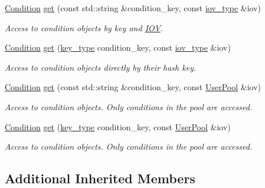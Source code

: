 \begin{DoxyCompactItemize}
\hyperlink{class_d_d4hep_1_1_conditions_1_1_condition}{Condition} \hyperlink{class_d_d4hep_1_1_conditions_1_1_container_af456b3ae43eea6491b6aa9b128faab66}{get} (const std\+::string \&condition\+\_\+key, const \hyperlink{class_d_d4hep_1_1_conditions_1_1_container_a169b09fd183c9e05faf63429bad6c668}{iov\+\_\+type} \&iov)
\begin{DoxyCompactList}\small\item\em Access to condition objects by key and \hyperlink{class_d_d4hep_1_1_i_o_v}{I\+OV}. \end{DoxyCompactList}\item 
\hyperlink{class_d_d4hep_1_1_conditions_1_1_condition}{Condition} \hyperlink{class_d_d4hep_1_1_conditions_1_1_container_a1b9bfc1fd9fbb6953f1b1cf682263cc5}{get} (\hyperlink{class_d_d4hep_1_1_conditions_1_1_container_a65e62d9e4a43b9b0e9e46a7b80876a21}{key\+\_\+type} condition\+\_\+key, const \hyperlink{class_d_d4hep_1_1_conditions_1_1_container_a169b09fd183c9e05faf63429bad6c668}{iov\+\_\+type} \&iov)
\begin{DoxyCompactList}\small\item\em Access to condition objects directly by their hash key. \end{DoxyCompactList}\item 
\hyperlink{class_d_d4hep_1_1_conditions_1_1_condition}{Condition} \hyperlink{class_d_d4hep_1_1_conditions_1_1_container_a03d964c9a3b0737564b3a28bb9e8ad03}{get} (const std\+::string \&condition\+\_\+key, const \hyperlink{class_d_d4hep_1_1_conditions_1_1_user_pool}{User\+Pool} \&iov)
\begin{DoxyCompactList}\small\item\em Access to condition objects. Only conditions in the pool are accessed. \end{DoxyCompactList}\item 
\hyperlink{class_d_d4hep_1_1_conditions_1_1_condition}{Condition} \hyperlink{class_d_d4hep_1_1_conditions_1_1_container_a6364c939553b81e4c5e05ac98d7f01a0}{get} (\hyperlink{class_d_d4hep_1_1_conditions_1_1_container_a65e62d9e4a43b9b0e9e46a7b80876a21}{key\+\_\+type} condition\+\_\+key, const \hyperlink{class_d_d4hep_1_1_conditions_1_1_user_pool}{User\+Pool} \&iov)
\begin{DoxyCompactList}\small\item\em Access to condition objects. Only conditions in the pool are accessed. \end{DoxyCompactList}\end{DoxyCompactItemize}
\subsection*{Additional Inherited Members}


